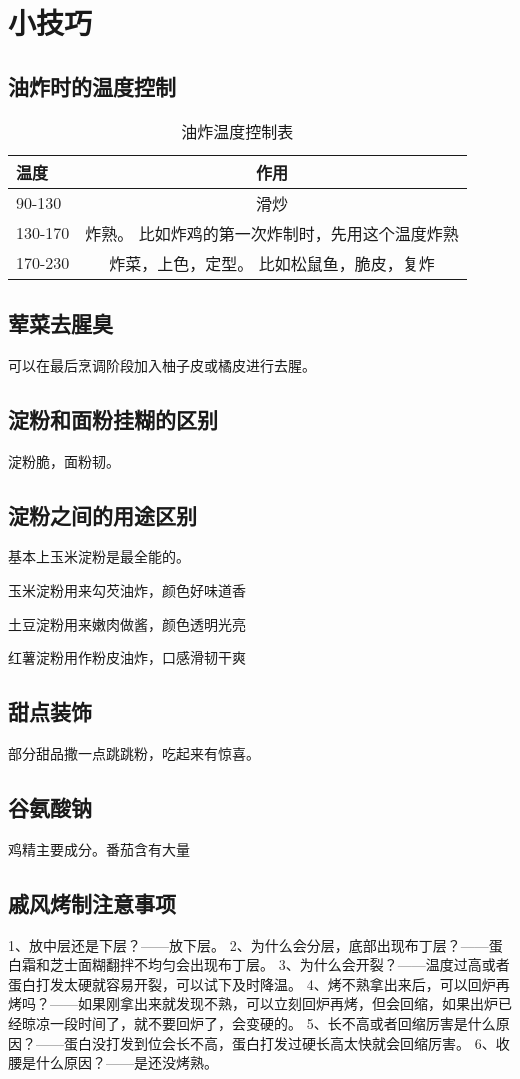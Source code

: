 \section{小技巧}

\subsection{油炸时的温度控制}

\begin{table}[h]
    \centering
    \begin{tabular}{|l||c|}\hline
     \textbf{温度}    &  \textbf{作用}\\ \hline\hline
    90-130     &  滑炒 \\ \hline
    130-170    &   炸熟。 比如炸鸡的第一次炸制时，先用这个温度炸熟\\ \hline
    170-230     &   炸菜，上色，定型。 比如松鼠鱼，脆皮，复炸 \\ \hline
    
    \end{tabular}
    \caption{油炸温度控制表}
\end{table}


\subsection{荤菜去腥臭}
可以在最后烹调阶段加入柚子皮或橘皮进行去腥。

\subsection{淀粉和面粉挂糊的区别}
淀粉脆，面粉韧。

\subsection{淀粉之间的用途区别}
基本上玉米淀粉是最全能的。

玉米淀粉用来勾芡油炸，颜色好味道香

土豆淀粉用来嫩肉做酱，颜色透明光亮

红薯淀粉用作粉皮油炸，口感滑韧干爽

\subsection{甜点装饰}
部分甜品撒一点跳跳粉，吃起来有惊喜。



\subsection{谷氨酸钠}
鸡精主要成分。番茄含有大量


\subsection{戚风烤制注意事项}
1、放中层还是下层？——放下层。
2、为什么会分层，底部出现布丁层？——蛋白霜和芝士面糊翻拌不均匀会出现布丁层。
3、为什么会开裂？——温度过高或者蛋白打发太硬就容易开裂，可以试下及时降温。
4、烤不熟拿出来后，可以回炉再烤吗？——如果刚拿出来就发现不熟，可以立刻回炉再烤，但会回缩，如果出炉已经晾凉一段时间了，就不要回炉了，会变硬的。
5、长不高或者回缩厉害是什么原因？——蛋白没打发到位会长不高，蛋白打发过硬长高太快就会回缩厉害。
6、收腰是什么原因？——是还没烤熟。